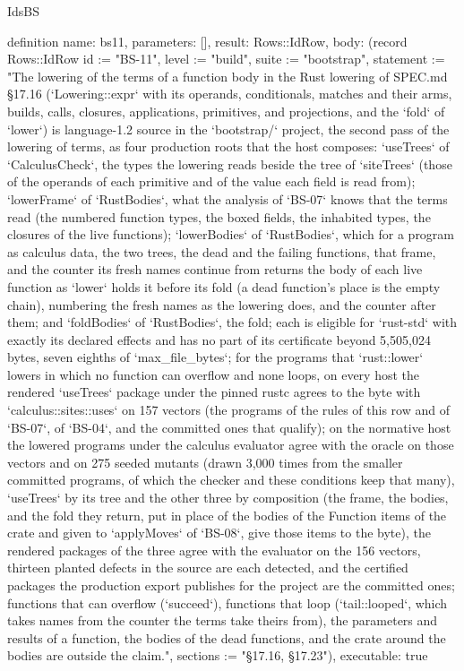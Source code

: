 \begin{lexlean}{IdsBS}
\begin{semanticmodule}
definition{
  name: bs11,
  parameters: [],
  result: Rows::IdRow,
  body: (record Rows::IdRow {id := "BS-11", level := "build", suite := "bootstrap", statement := "The lowering of the terms of a function body in the Rust lowering of SPEC.md §17.16 (`Lowering::expr` with its operands, conditionals, matches and their arms, builds, calls, closures, applications, primitives, and projections, and the `fold` of `lower`) is language-1.2 source in the `bootstrap/` project, the second pass of the lowering of terms, as four production roots that the host composes: `useTrees` of `CalculusCheck`, the types the lowering reads beside the tree of `siteTrees` (those of the operands of each primitive and of the value each field is read from); `lowerFrame` of `RustBodies`, what the analysis of `BS-07` knows that the terms read (the numbered function types, the boxed fields, the inhabited types, the closures of the live functions); `lowerBodies` of `RustBodies`, which for a program as calculus data, the two trees, the dead and the failing functions, that frame, and the counter its fresh names continue from returns the body of each live function as `lower` holds it before its fold (a dead function's place is the empty chain), numbering the fresh names as the lowering does, and the counter after them; and `foldBodies` of `RustBodies`, the fold; each is eligible for `rust-std` with exactly its declared effects and has no part of its certificate beyond 5,505,024 bytes, seven eighths of `max_file_bytes`; for the programs that `rust::lower` lowers in which no function can overflow and none loops, on every host the rendered `useTrees` package under the pinned rustc agrees to the byte with `calculus::sites::uses` on 157 vectors (the programs of the rules of this row and of `BS-07`, of `BS-04`, and the committed ones that qualify); on the normative host the lowered programs under the calculus evaluator agree with the oracle on those vectors and on 275 seeded mutants (drawn 3,000 times from the smaller committed programs, of which the checker and these conditions keep that many), `useTrees` by its tree and the other three by composition (the frame, the bodies, and the fold they return, put in place of the bodies of the Function items of the crate and given to `applyMoves` of `BS-08`, give those items to the byte), the rendered packages of the three agree with the evaluator on the 156 vectors, thirteen planted defects in the source are each detected, and the certified packages the production export publishes for the project are the committed ones; functions that can overflow (`succeed`), functions that loop (`tail::looped`, which takes names from the counter the terms take theirs from), the parameters and results of a function, the bodies of the dead functions, and the crate around the bodies are outside the claim.", sections := "§17.16, §17.23"}),
  executable: true
}


\end{semanticmodule}
\end{lexlean}
